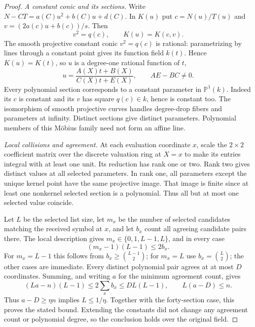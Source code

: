 \begin{proof}
\emph{A constant conic and its sections.}
Write $N-CT=a(C)u^2+b(C)u+d(C)$.  In $K(u)$ put
$c=N(u)/T(u)$ and $v=(2a(c)u+b(c))/s$.  Then
\[
 v^2=q(c),\qquad K(u)=K(c,v).
\]
The smooth projective constant conic $v^2=q(c)$ is rational:
parametrizing by lines through a constant point gives its function
field $k(t)$.  Hence $K(u)=K(t)$, so $u$ is a degree-one rational
function of $t$,
\[
 u=\frac{A(X)t+B(X)}{C(X)t+E(X)},\qquad AE-BC\ne0.
\]
Every polynomial section corresponds to a constant parameter in
$\mathbb P^1(k)$.  Indeed its $c$ is constant and its $v$ has square
$q(c)\in k$, hence is constant too.  The isomorphism of smooth
projective curves handles degree-drop fibers and parameters at
infinity.  Distinct sections give distinct parameters.  Polynomial
members of this M\"obius family need not form an affine line.

\emph{Local collisions and agreement.}
At each evaluation coordinate $x$, scale the $2\times2$ coefficient
matrix over the discrete valuation ring at $X=x$ to make its
entries integral with at least one unit.  Its reduction has rank
one or two.  Rank two gives distinct values at all selected
parameters.  In rank one, all parameters except the unique kernel
point have the same projective image.  That image is finite since
at least one nonkernel selected section is a polynomial.  Thus
all but at most one selected value coincide.

Let $L$ be the selected list size, let $m_x$ be the number of
selected candidates matching the received symbol at $x$, and let
$b_x$ count all agreeing candidate pairs there.  The local description
gives $m_x\in\{0,1,L-1,L\}$, and in every case
\[
 (m_x-1)(L-1)\le 2b_x.
\]
For $m_x=L-1$ this follows from $b_x\ge\binom{L-1}{2}$;
for $m_x=L$ use $b_x=\binom L2$; the other cases are immediate.
Every distinct polynomial pair agrees at at most $D$ coordinates.
Summing, and writing $a$ for the minimum agreement count, gives
\[
 (La-n)(L-1)\le 2\sum_x b_x
       \le D L(L-1),\qquad L(a-D)\le n.
\]
Thus $a-D\ge\eta n$ implies $L\le1/\eta$.
Together with the forty-section
case, this proves the stated bound.  Extending the constants did
not change any agreement count or polynomial degree, so the
conclusion holds over the original field.
\end{proof}
